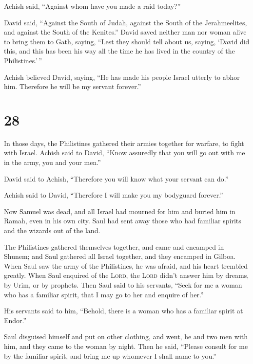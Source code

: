  Achish said, ``Against whom have you made a raid
today?''

David said, ``Against the South of Judah, against the South of the
Jerahmeelites, and against the South of the Kenites.'' 
David saved neither man nor woman alive to bring them to Gath, saying,
``Lest they should tell about us, saying, `David did this, and this has
been his way all the time he has lived in the country of the
Philistines.'\,''

 Achish believed David, saying, ``He has made his people
Israel utterly to abhor him. Therefore he will be my servant forever.''

\hypertarget{section-27}{%
\section{28}\label{section-27}}

 In those days, the Philistines gathered their armies
together for warfare, to fight with Israel. Achish said to David, ``Know
assuredly that you will go out with me in the army, you and your men.''

 David said to Achish, ``Therefore you will know what your
servant can do.''

Achish said to David, ``Therefore I will make you my bodyguard
forever.''

 Now Samuel was dead, and all Israel had mourned for him
and buried him in Ramah, even in his own city. Saul had sent away those
who had familiar spirits and the wizards out of the land.

 The Philistines gathered themselves together, and came
and encamped in Shunem; and Saul gathered all Israel together, and they
encamped in Gilboa.  When Saul saw the army of the
Philistines, he was afraid, and his heart trembled greatly.
 When Saul enquired of the \textsc{Lord}, the
\textsc{Lord} didn't answer him by dreams, by Urim, or by prophets.
 Then Saul said to his servants, ``Seek for me a woman who
has a familiar spirit, that I may go to her and enquire of her.''

His servants said to him, ``Behold, there is a woman who has a familiar
spirit at Endor.''

 Saul disguised himself and put on other clothing, and
went, he and two men with him, and they came to the woman by night. Then
he said, ``Please consult for me by the familiar spirit, and bring me up
whomever I shall name to you.''

